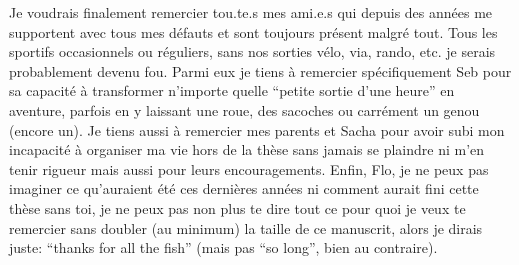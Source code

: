 Je voudrais finalement remercier tou.te.s mes ami.e.s qui depuis des années me supportent avec tous mes défauts et sont toujours présent malgré tout.
Tous les sportifs occasionnels ou réguliers, sans nos sorties vélo, via, rando, etc. je serais probablement devenu fou.
Parmi eux je tiens à remercier spécifiquement Seb pour sa capacité à transformer n'importe quelle “petite sortie d'une heure” en aventure, parfois en y laissant une roue, des sacoches ou carrément un genou (encore un).
Je tiens aussi à remercier mes parents et Sacha pour avoir subi mon incapacité à organiser ma vie hors de la thèse sans jamais se plaindre ni m'en tenir rigueur mais aussi pour leurs encouragements.
Enfin, Flo, je ne peux pas imaginer ce qu'auraient été ces dernières années ni comment aurait fini cette thèse sans toi, je ne peux pas non plus te dire tout ce pour quoi je veux te remercier sans doubler (au minimum) la taille de ce manuscrit, alors je dirais juste: “thanks for all the fish” (mais pas “so long”, bien au contraire).

\glsresetall
